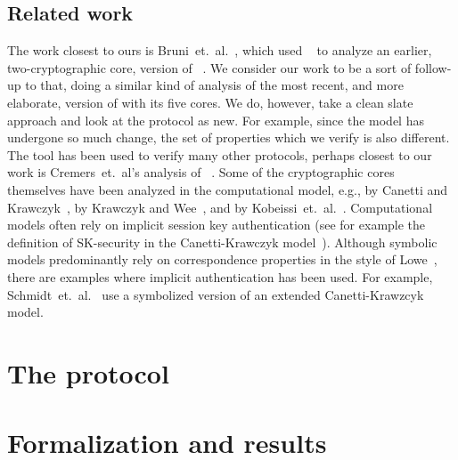 \documentclass[runningheads,draft,x11names]{llncs}
\begin{document}
\subsection{Related work}
\label{sec:relatedWork}
The work closest to ours is Bruni~et.~al.~\cite{DBLP:conf/secsr/BruniJPS18},
which used \mProverif~\cite{DBLP:conf/csfw/Blanchet01} to analyze an earlier,
two-cryptographic core, version of \mEdhoc~\cite{selander-ace-cose-ecdhe-08}.
%
We consider our work to be a sort of follow-up to that, doing a similar kind of
analysis of the most recent, and more elaborate, version of \mEdhoc{} with its
five cores.
%
We do, however, take a clean slate approach and look at the protocol as new.
%
For example, since the model has undergone so much change, the set of properties
which we verify is also different.
%
The \mTamarin{} tool has been used to verify many other protocols, perhaps
closest to our work is Cremers~et.~al's analysis of
\mTls~\cite{DBLP:conf/ccs/CremersHHSM17}.
%
Some of the cryptographic cores themselves have been analyzed in the
computational model, e.g., \mSigma{} by Canetti and
Krawczyk~\cite{DBLP:conf/crypto/CanettiK02}, \mOptls{} by Krawczyk and
Wee~\cite{DBLP:conf/eurosp/KrawczykW16}, and \mNoise{} by
Kobeissi~et.~al.~\cite{DBLP:conf/eurosp/KobeissiNB19}.
%
Computational models often rely on implicit session key authentication
(see for example the definition of SK-security in the Canetti-Krawczyk
model~\cite{DBLP:conf/crypto/CanettiK02}).
%
Although symbolic models predominantly rely on correspondence properties in the
style of Lowe~\cite{DBLP:conf/csfw/Lowe97a}, there are examples where implicit
authentication has been used.
%
For example, Schmidt~et.~al.~\cite{DBLP:conf/csfw/SchmidtMCB12} use a
symbolized version of an extended Canetti-Krawzcyk model.
%

\section{The \mEdhoc{} protocol}
\label{sec:edhoc}


\section{Formalization and results}
\label{sec:formalization}


\end{document}

